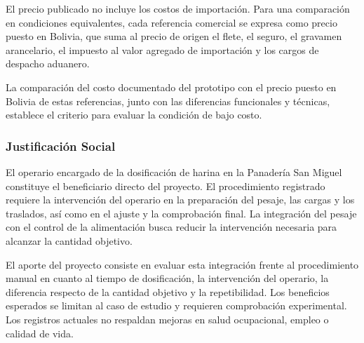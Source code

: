 
El precio publicado no incluye los costos de importación. Para una
comparación en condiciones equivalentes, cada referencia comercial se
expresa como precio puesto en Bolivia, que suma al precio de origen el
flete, el seguro, el gravamen arancelario, el impuesto al valor agregado de
importación y los cargos de despacho aduanero.

La comparación del costo documentado del prototipo con el precio puesto en
Bolivia de estas referencias, junto con las diferencias funcionales y
técnicas, establece el criterio para evaluar la condición de bajo costo.

\subsubsection{Justificación Social}
\label{subsec:justificacion_social}  %

El operario encargado de la dosificación de harina en la Panadería San
Miguel constituye el beneficiario directo del proyecto. El procedimiento
registrado requiere la intervención del operario en la preparación del
pesaje, las cargas y los traslados, así como en el ajuste y la comprobación
final. La integración del pesaje con el control de la alimentación busca
reducir la intervención necesaria para alcanzar la cantidad objetivo.

El aporte del proyecto consiste en evaluar esta integración frente al
procedimiento manual en cuanto al tiempo de dosificación, la
intervención del operario, la diferencia respecto de la cantidad objetivo y
la repetibilidad. Los beneficios esperados se limitan al caso de estudio y
requieren comprobación experimental. Los registros actuales no respaldan
mejoras en salud ocupacional, empleo o calidad de vida.


